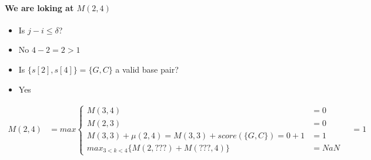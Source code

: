 \paragraph{We are loking at $M(2,4)$}
\begin{itemize}
    \item[] Is $j-i \leq \delta$?
    \item[$\rightarrow$]  No $4-2 = 2 > 1$
    \item[] Is $\{s[2], s[4]\} = \{G, C\}$ a valid base pair?
    \item[$\rightarrow$]  Yes
\end{itemize}


\begin{align*}
    M(2,4) & = max \begin{cases}
                       M(3,4) & = 0 \\ %
                       M(2,3) & = 0 \\ %
                       M(3,3) + \mu(2,4) = M(3,3) + score(\{G, C\}) = 0 + 1 & = 1 \\ %
                       max_{3 < k < 4} \{ M(2, ???) + M( ???, 4) \} & = NaN
    \end{cases} \quad =  1
\end{align*}



